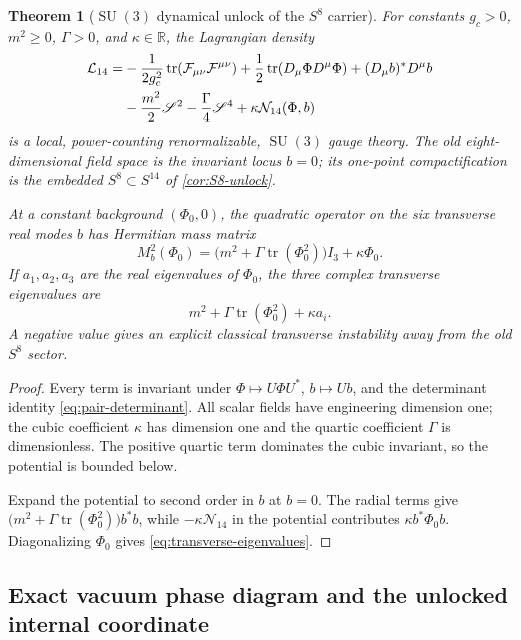 \documentclass[11pt]{article}
\newtheorem{theorem}{Theorem}[section]
\theoremstyle{definition}
\theoremstyle{remark}
\newcommand{\R}{\mathbb R}
\newcommand{\tr}{\operatorname{tr}}
\newcommand{\SU}{\operatorname{SU}}
\newcommand{\cN}{\mathcal N}
\begin{document}
\begin{theorem}[\texorpdfstring{$\SU(3)$}{SU(3)} dynamical unlock of the \texorpdfstring{$S^8$}{S8} carrier]\label{thm:SU3-dynamics}
For constants $g_c>0$, $m^2\geq0$, $\Gamma>0$, and $\kappa\in\R$, the Lagrangian density
\begin{align}\label{eq:SU3-Lagrangian}
 \mathcal L_{14}
 =&-\frac1{2g_c^2}\tr(\mathcal F_{\mu\nu}\mathcal F^{\mu\nu})
 +\frac12\tr(D_\mu\Phi D^\mu\Phi)
 +(D_\mu b)^*D^\mu b\notag\\
 &-\frac{m^2}{2}\mathscr S^2
 -\frac{\Gamma}{4}\mathscr S^4
 +\kappa\cN_{14}(\Phi,b)
\end{align}
is a local, power-counting renormalizable, $\SU(3)$ gauge theory.  The old eight-dimensional field space is the invariant locus $b=0$; its one-point compactification is the embedded $S^8\subset S^{14}$ of \cref{cor:S8-unlock}.

At a constant background $(\Phi_0,0)$, the quadratic operator on the six transverse real modes $b$ has Hermitian mass matrix
\begin{equation}\label{eq:transverse-mass}
 \boxed{
 M_b^2(\Phi_0)
 =\bigl(m^2+\Gamma\tr(\Phi_0^2)\bigr)I_3+\kappa\Phi_0.}
\end{equation}
If $a_1,a_2,a_3$ are the real eigenvalues of $\Phi_0$, the three complex transverse eigenvalues are
\begin{equation}\label{eq:transverse-eigenvalues}
 m^2+\Gamma\tr(\Phi_0^2)+\kappa a_i.
\end{equation}
A negative value gives an explicit classical transverse instability away from the old $S^8$ sector.
\end{theorem}

\begin{proof}
Every term is invariant under
$\Phi\mapsto U\Phi U^*$, $b\mapsto Ub$, and the determinant identity
\eqref{eq:pair-determinant}.  All scalar fields have engineering dimension one; the cubic coefficient $\kappa$ has dimension one and the quartic coefficient $\Gamma$ is dimensionless.  The positive quartic term dominates the cubic invariant, so the potential is bounded below.

Expand the potential to second order in $b$ at $b=0$.  The radial terms give
$\bigl(m^2+\Gamma\tr(\Phi_0^2)\bigr)b^*b$, while
$-\kappa\cN_{14}$ in the potential contributes $\kappa b^*\Phi_0b$.  Diagonalizing $\Phi_0$ gives \eqref{eq:transverse-eigenvalues}.
\end{proof}


\subsection{Exact vacuum phase diagram and the unlocked internal coordinate}
\end{document}
